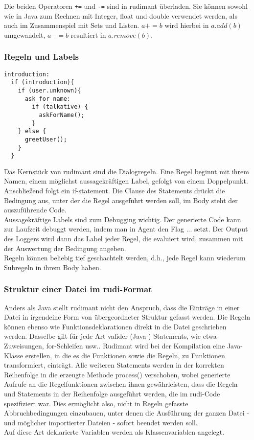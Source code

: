 Die beiden Operatoren \texttt{+=} und \texttt{-=} sind in rudimant überladen. Sie können sowohl wie in Java zum Rechnen mit Integer, float und double verwendet werden, als auch im Zusammenspiel mit Sets und Listen. $ a += b $ wird hierbei in $ a.add(b) $ umgewandelt, $ a-= b $ resultiert in $ a.remove(b) $.
  
\subsubsection{Regeln und Labels}

\begin{verbatim}
introduction:
  if (introduction){
    if (user.unknown){
      ask_for_name:
        if (talkative) {
          askForName();
        }
    } else {
      greetUser();
    }
  }
\end{verbatim}

Das Kernstück von rudimant sind die Dialogregeln. Eine Regel beginnt mit ihrem Namen, einem möglichst aussagekräftigen Label, gefolgt von einem Doppelpunkt. Anschließend folgt ein if-statement. Die Clause des Statements drückt die Bedingung aus, unter der die Regel ausgeführt werden soll, im Body steht der auszuführende Code.\\
Aussagekräftige Labels sind zum Debugging wichtig. Der generierte Code kann zur Laufzeit debuggt werden, indem man in Agent den Flag ... setzt. Der Output des Loggers wird dann das Label jeder Regel, die evaluiert wird, zusammen mit der Auswertung der Bedingung angeben.\\
Regeln können beliebig tief geschachtelt werden, d.h., jede Regel kann wiederum Subregeln in ihrem Body haben.


\subsubsection{Struktur einer Datei im rudi-Format}

Anders als Java stellt rudimant nicht den Anspruch, dass die Einträge in einer Datei in irgendeine Form von übergeordneter Struktur gefasst werden. Die Regeln können ebenso wie Funktionsdeklarationen direkt in die Datei geschrieben werden. Dasselbe gilt für jede Art valider (Java-) Statements, wie etwa Zuweisungen, for-Schleifen usw.. Rudimant wird bei der Kompilation eine Java-Klasse erstellen, in die es die Funktionen sowie die Regeln, zu Funktionen transformiert, einträgt. Alle weiteren Statements werden in der korrekten Reihenfolge in die erzeugte Methode process() verschoben, wobei generierte Aufrufe an die Regelfunktionen zwischen ihnen gewährleisten, dass die Regeln und Statements in der Reihenfolge ausgeführt werden, die im rudi-Code spezifiziert war. Dies ermöglicht also, nicht in Regeln gefasste Abbruchbedingungen einzubauen, unter denen die Ausführung der ganzen Datei - und möglicher importierter Dateien - sofort beendet werden soll.\\
Auf diese Art deklarierte Variablen werden als Klassenvariablen angelegt.

